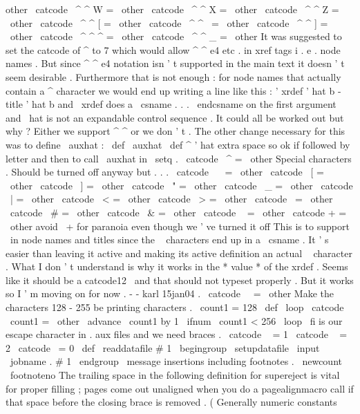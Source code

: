 {{{{{other
\
catcode
\
^
^
W
=
\
other
\
catcode
\
^
^
X
=
\
other
\
catcode
\
^
^
Z
=
\
other
\
catcode
\
^
^
[
=
\
other
\
catcode
\
^
^
\
=
\
other
\
catcode
\
^
^
]
=
\
other
\
catcode
\
^
^
^
=
\
other
\
catcode
\
^
^
_
=
\
other
%
It
was
suggested
to
set
the
catcode
of
^
to
7
which
would
allow
^
^
e4
etc
.
%
in
xref
tags
i
.
e
.
node
names
.
But
since
^
^
e4
notation
isn
'
t
%
supported
in
the
main
text
it
doesn
'
t
seem
desirable
.
Furthermore
%
that
is
not
enough
:
for
node
names
that
actually
contain
a
^
%
character
we
would
end
up
writing
a
line
like
this
:
'
xrdef
{
'
hat
%
b
-
title
}
{
'
hat
b
}
and
\
xrdef
does
a
\
csname
.
.
.
\
endcsname
on
the
first
%
argument
and
\
hat
is
not
an
expandable
control
sequence
.
It
could
%
all
be
worked
out
but
why
?
Either
we
support
^
^
or
we
don
'
t
.
%
%
The
other
change
necessary
for
this
was
to
define
\
auxhat
:
%
\
def
\
auxhat
{
\
def
^
{
'
hat
}
}
%
extra
space
so
ok
if
followed
by
letter
%
and
then
to
call
\
auxhat
in
\
setq
.
%
\
catcode
\
^
=
\
other
%
%
Special
characters
.
Should
be
turned
off
anyway
but
.
.
.
\
catcode
\
~
=
\
other
\
catcode
\
[
=
\
other
\
catcode
\
]
=
\
other
\
catcode
\
"
=
\
other
\
catcode
\
_
=
\
other
\
catcode
\
|
=
\
other
\
catcode
\
<
=
\
other
\
catcode
\
>
=
\
other
\
catcode
\
=
\
other
\
catcode
\
#
=
\
other
\
catcode
\
&
=
\
other
\
catcode
\
%
=
\
other
\
catcode
+
=
\
other
%
avoid
\
+
for
paranoia
even
though
we
'
ve
turned
it
off
%
%
This
is
to
support
\
in
node
names
and
titles
since
the
\
%
characters
end
up
in
a
\
csname
.
It
'
s
easier
than
%
leaving
it
active
and
making
its
active
definition
an
actual
\
%
character
.
What
I
don
'
t
understand
is
why
it
works
in
the
*
value
*
%
of
the
xrdef
.
Seems
like
it
should
be
a
catcode12
\
and
that
%
should
not
typeset
properly
.
But
it
works
so
I
'
m
moving
on
for
%
now
.
-
-
karl
15jan04
.
\
catcode
\
\
=
\
other
%
%
Make
the
characters
128
-
255
be
printing
characters
.
{
%
\
count1
=
128
\
def
\
loop
{
%
\
catcode
\
count1
=
\
other
\
advance
\
count1
by
1
\
ifnum
\
count1
<
256
\
loop
\
fi
}
%
}
%
%
%
is
our
escape
character
in
.
aux
files
and
we
need
braces
.
\
catcode
\
{
=
1
\
catcode
\
}
=
2
\
catcode
\
=
0
}
\
def
\
readdatafile
#
1
{
%
\
begingroup
\
setupdatafile
\
input
\
jobname
.
#
1
\
endgroup
}
\
message
{
insertions
}
%
including
footnotes
.
\
newcount
\
footnoteno
%
The
trailing
space
in
the
following
definition
for
supereject
is
%
vital
for
proper
filling
;
pages
come
out
unaligned
when
you
do
a
%
pagealignmacro
call
if
that
space
before
the
closing
brace
is
%
removed
.
(
Generally
numeric
constants
}}}}
